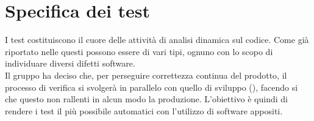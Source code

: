 \section{Specifica dei test}
I test costituiscono il cuore delle attività di analisi dinamica sul codice. Come già riportato nelle  questi possono essere di vari tipi, ognuno con lo scopo di individuare diversi difetti software. \\
Il gruppo \Gruppo{} ha deciso che, per perseguire correttezza continua del prodotto, il processo di verifica si svolgerà in parallelo con quello di sviluppo (), facendo si che questo non rallenti in alcun modo la produzione. L'obiettivo è quindi di rendere i test il più possibile automatici con l'utilizzo di software appositi. 






